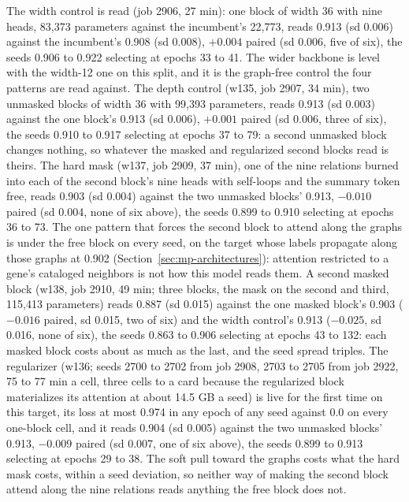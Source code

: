 The width control is read (job 2906, 27 min): one block of width 36 with nine heads,
83,373 parameters against the incumbent's 22,773, reads 0.913 (sd 0.006) against the
incumbent's 0.908 (sd 0.008), $+0.004$ paired (sd 0.006, five of six), the seeds 0.906
to 0.922 selecting at epochs 33 to 41. The wider backbone is level with the width-12
one on this split, and it is the graph-free control the four patterns are read
against.
The depth control (w135, job 2907, 34 min), two unmasked blocks of width 36 with
99,393 parameters, reads 0.913 (sd 0.003) against the one block's 0.913 (sd 0.006),
$+0.001$ paired (sd 0.006, three of six), the seeds 0.910 to 0.917 selecting at epochs
37 to 79: a second unmasked block changes nothing, so whatever the masked and
regularized second blocks read is theirs.
The hard mask (w137, job 2909, 37 min), one of the nine relations burned into each of
the second block's nine heads with self-loops and the summary token free, reads 0.903
(sd 0.004) against the two unmasked blocks' 0.913, $-0.010$ paired (sd 0.004, none of
six above), the seeds 0.899 to 0.910 selecting at epochs 36 to 73. The one pattern
that forces the second block to attend along the graphs is under the free block on
every seed, on the target whose labels propagate along those graphs at 0.902
(Section~\ref{sec:mp-architectures}): attention restricted to a gene's cataloged
neighbors is not how this model reads them.
A second masked block (w138, job 2910, 49 min; three blocks, the mask on the second
and third, 115,413 parameters) reads 0.887 (sd 0.015) against the one masked block's
0.903 ($-0.016$ paired, sd 0.015, two of six) and the width control's 0.913 ($-0.025$,
sd 0.016, none of six), the seeds 0.863 to 0.906 selecting at epochs 43 to 132: each
masked block costs about as much as the last, and the seed spread triples.
The regularizer (w136; seeds 2700 to 2702 from job 2908, 2703 to 2705 from job 2922,
75 to 77 min a cell, three cells to a card because the regularized block materializes
its attention at about 14.5 GB a seed) is live for the first time on this target, its
loss at most 0.974 in any epoch of any seed against 0.0 on every one-block cell, and
it reads 0.904 (sd 0.005) against the two unmasked blocks' 0.913, $-0.009$ paired (sd
0.007, one of six above), the seeds 0.899 to 0.913 selecting at epochs 29 to 38. The
soft pull toward the graphs costs what the hard mask costs, within a seed deviation,
so neither way of making the second block attend along the nine relations reads
anything the free block does not.

